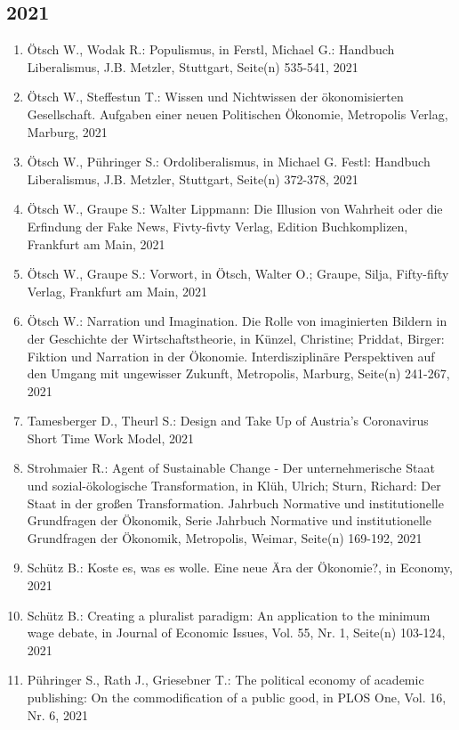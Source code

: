 \subsection*{2021}
\begin{enumerate}
    	 \item Ötsch W., Wodak R.: Populismus, in Ferstl, Michael G.: Handbuch Liberalismus, J.B. Metzler, Stuttgart, Seite(n) 535-541, 2021
	 \item Ötsch W., Steffestun T.: Wissen und Nichtwissen der ökonomisierten Gesellschaft. Aufgaben einer neuen Politischen Ökonomie, Metropolis Verlag, Marburg, 2021
	 \item Ötsch W., Pühringer S.: Ordoliberalismus, in Michael G. Festl: Handbuch Liberalismus, J.B. Metzler, Stuttgart, Seite(n) 372-378, 2021
	 \item Ötsch W., Graupe S.: Walter Lippmann: Die Illusion von Wahrheit oder die Erfindung der Fake News, Fivty-fivty Verlag, Edition Buchkomplizen, Frankfurt am Main, 2021
	 \item Ötsch W., Graupe S.: Vorwort, in Ötsch, Walter O.; Graupe, Silja, Fifty-fifty Verlag, Frankfurt am Main, 2021
	 \item Ötsch W.: Narration und Imagination. Die Rolle von imaginierten Bildern in der Geschichte der Wirtschaftstheorie, in Künzel, Christine; Priddat, Birger: Fiktion und Narration in der Ökonomie. Interdisziplinäre Perspektiven auf den Umgang mit ungewisser Zukunft, Metropolis, Marburg, Seite(n) 241-267, 2021
	 \item Tamesberger D., Theurl S.: Design and Take Up of Austria’s Coronavirus Short Time Work Model, 2021
	 \item Strohmaier R.: Agent of Sustainable Change - Der unternehmerische Staat und sozial-ökologische Transformation, in Klüh, Ulrich; Sturn, Richard: Der Staat in der großen Transformation. Jahrbuch Normative und institutionelle Grundfragen der Ökonomik, Serie Jahrbuch Normative und institutionelle Grundfragen der Ökonomik, Metropolis, Weimar, Seite(n) 169-192, 2021
	 \item Schütz B.: \glqq Koste es, was es wolle\grqq{}. Eine neue Ära der Ökonomie?, in Economy, 2021
	 \item Schütz B.: Creating a pluralist paradigm: An application to the minimum wage debate, in Journal of Economic Issues, Vol. 55, Nr. 1, Seite(n) 103-124, 2021
	 \item Pühringer S., Rath J., Griesebner T.: The political economy of academic publishing: On the commodification of a public good, in PLOS One, Vol. 16, Nr. 6, 2021

\end{enumerate}

